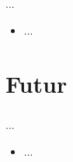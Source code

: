 \documentclass{beamer}
\begin{document}
  \begin{frame}
    \frametitle{\secname}
    \vfill

    ...
    \begin{itemize}
      \item ...
    \end{itemize}


    \vfill
  \end{frame}


  \section{Futur}


  \begin{frame}
    \frametitle{\secname}
    \vfill

    ...
    \begin{itemize}
      \item ...
    \end{itemize}


    \vfill
  \end{frame}
\end{document}
